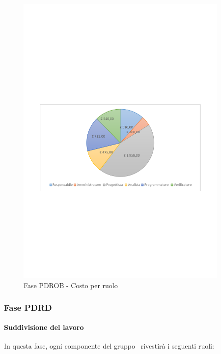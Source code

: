 \documentclass[../PianoProgetto.tex]{subfiles}
\begin{document}
\vfill	
	\begin{figure}[!h]
		\centering
		\includegraphics[width=0.93\textwidth , trim=2cm 9.5cm 2cm 11cm]{grafici/PDROB/PDROB-costo}
			\caption{Fase PDROB - Costo per ruolo}
		\label{fig:CircleChart-fasePDROB_costo}
	\end{figure}
\vfill	
\newpage	
	
	\subsubsection{Fase PDRD}
				\paragraph{Suddivisione del lavoro}
					In questa fase\g, ogni componente del gruppo \leaf\ rivestirà i seguenti ruoli:
	
\end{document}
